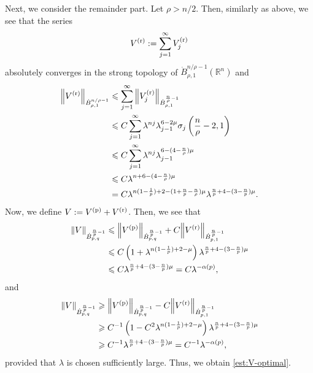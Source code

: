 \documentclass[a4paper,12pt,reqno]{amsart}
\theoremstyle{plain}
\theoremstyle{definition}
\newcommand{\dB}{\dot{B}}
\renewcommand{\leq}{\leqslant}
\renewcommand{\geq}{\geqslant}
\newcommand{\n}[1]{{\left\|#1\right\|}}
\newcommand{\R}{\mathbb{R}}
\renewcommand{\sp}[1]{\left(#1\right)}
\newcommand{\p}{{\rm p}}
\renewcommand{\r}{{\rm r}}
\begin{document}
Next, we consider the remainder part.
Let $\rho>n/2$.
Then, similarly as above, we see that the series 
\begin{align}
    V^{(\r)}
    :=
    \sum_{j=1}^{\infty}V_j^{(\r)}
\end{align}
absolutely converges in the strong topology of $\dB_{\rho,1}^{n/\rho-1}(\R^n)$ and 
\begin{align}
    \n{V^{(\r)}}_{\dB_{\rho,1}^{n/\rho-1}} 
    &\leq 
    \sum_{j=1}^{\infty}
    \n{V_j^{(\r)}}_{\dB_{\rho,1}^{\frac{n}{\rho}-1}}
    \\
    &
    \leq 
    C
    \sum_{j=1}^{\infty}
    \lambda^{nj}
    \lambda_{j-1}^{6-2\mu}
    \sigma_j\sp{\frac{n}{\rho}-2,1}
    \\
    &
    \leq 
    C
    \sum_{j=1}^{\infty}
    \lambda^{nj}
    \lambda_{j-1}^{6-(4-\frac{n}{\rho})\mu}
    \\
    &
    \leq 
    C\lambda^{n+6-(4-\frac{n}{\rho})\mu}
    \\
    &
    =
    C
    \lambda^{n(1-\frac{1}{p})+2-(1+\frac{n}{p}-\frac{n}{\rho})\mu}
    \lambda^{\frac{n}{p}+4-(3-\frac{n}{p})\mu}.
\end{align}
Now, we define $V:=V^{(\p)}+V^{(\r)}$.
Then, we see that 
\begin{align}
    \n{V}_{\dB_{p,q}^{\frac{n}{p}-1}}
    &
    \leq 
    \n{V^{(\p)}}_{\dB_{p,q}^{\frac{n}{p}-1}}
    +
    C
    \n{V^{(\r)}}_{\dB_{p,1}^{\frac{n}{p}-1}}
    \\
    &
    \leq 
    C
    \sp{
    1
    +
    \lambda^{n(1-\frac{1}{p})+2-\mu}
    }
    \lambda^{\frac{n}{p}+4-(3-\frac{n}{p})\mu}
    \\
    &
    \leq 
    C
    \lambda^{\frac{n}{p}+4-(3-\frac{n}{p})\mu}
    =
    C\lambda^{-\alpha(p)},
\end{align}
and
\begin{align}
    \n{V}_{\dB_{p,q}^{\frac{n}{p}-1}}
    &
    \geq 
    \n{V^{(\p)}}_{\dB_{p,q}^{\frac{n}{p}-1}}
    -
    C
    \n{V^{(\r)}}_{\dB_{p,1}^{\frac{n}{p}-1}}
    \\
    &
    \geq 
    C^{-1}
    \sp{
    1
    -
    C^2
    \lambda^{n(1-\frac{1}{p})+2-\mu}
    }
    \lambda^{\frac{n}{p}+4-(3-\frac{n}{p})\mu}
    \\
    &
    \geq 
    C^{-1}
    \lambda^{\frac{n}{p}+4-(3-\frac{n}{p})\mu}
    =
    C^{-1}\lambda^{-\alpha(p)},
\end{align}
provided that $\lambda$ is chosen sufficiently large.
Thus, we obtain \eqref{est:V-optimal}.
%
\end{document}
